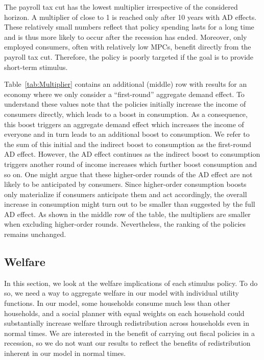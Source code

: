 \documentclass[qe]{econsocart}
\begin{document}
\vspace{0.5em}

The payroll tax cut has the lowest multiplier irrespective of the considered horizon.
A multiplier of close to 1 is reached only after 10 years with AD effects.
These relatively small numbers reflect that policy spending lasts for a long time and is thus more likely to occur after the recession has ended.
Moreover, only employed consumers, often with relatively low MPCs, benefit directly from the payroll tax cut.
Therefore, the policy is poorly targeted if the goal is to provide short-term stimulus.

Table~\ref{tab:Multiplier} contains an additional (middle) row with results for an economy where we only consider a ``first-round'' aggregate demand effect.
To understand these values note that the policies initially increase the income of consumers directly, which leads to a boost in consumption.
As a consequence, this boost triggers an aggregate demand effect which increases the income of everyone and in turn leads to an additional boost to consumption.
We refer to the sum of this initial and the indirect boost to consumption as the first-round AD effect.
However, the AD effect continues as the indirect boost to consumption triggers another round of income increases which further boost consumption and so on.
One might argue that these higher-order rounds of the AD effect are not likely to be anticipated by consumers.
Since higher-order consumption boosts only materialize if consumers anticipate them and act accordingly, the overall increase in consumption might turn out to be smaller than suggested by the full AD effect.
As shown in the middle row of the table, the multipliers are smaller when excluding higher-order rounds.
Nevertheless, the ranking of the policies remains unchanged.

\subsection{Welfare}
\label{sec:welfare} 

In this section, we look at the welfare implications of each stimulus policy.
To do so, we need a way to aggregate welfare in our model with individual utility functions.
In our model, some households consume much less than other households, and a social planner with equal weights on each household could substantially increase welfare through redistribution across households even in normal times.
We are interested in the benefit of carrying out fiscal policies in a recession, so we do not want our results to reflect the benefits of redistribution inherent in our model in normal times.
\end{document}
